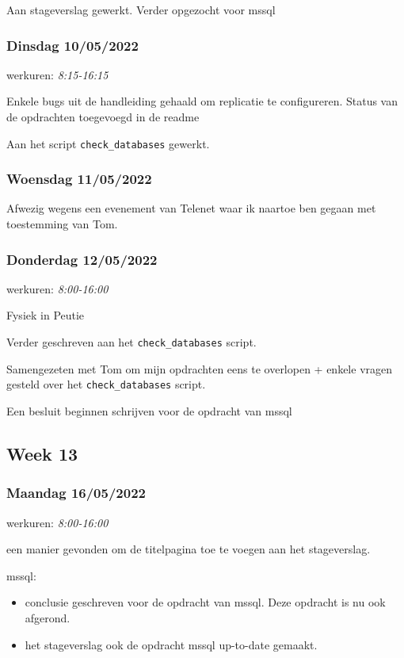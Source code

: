 Aan stageverslag gewerkt. Verder opgezocht voor mssql

\subsubsection{Dinsdag 10/05/2022}

werkuren: \emph{8:15-16:15}

Enkele bugs uit de handleiding gehaald om replicatie te configureren.  
Status van de opdrachten toegevoegd in de readme

Aan het script \verb*|check_databases| gewerkt.

\subsubsection{Woensdag 11/05/2022}

Afwezig wegens een evenement van Telenet waar ik naartoe ben gegaan met toestemming van Tom.

\subsubsection{Donderdag 12/05/2022}

werkuren: \emph{8:00-16:00}

Fysiek in Peutie

Verder geschreven aan het \verb*|check_databases| script.

Samengezeten met Tom om mijn opdrachten eens te overlopen + enkele vragen gesteld over het \verb*|check_databases| script.

Een besluit beginnen schrijven voor de opdracht van mssql

\subsection{Week 13}

\subsubsection{Maandag 16/05/2022}

werkuren: \emph{8:00-16:00}

een manier gevonden om de titelpagina toe te voegen aan het stageverslag.

mssql:

\begin{itemize}
	\item conclusie geschreven voor de opdracht van mssql. Deze opdracht is nu ook afgerond.
	\item het stageverslag ook de opdracht mssql up-to-date gemaakt.
\end{itemize}

